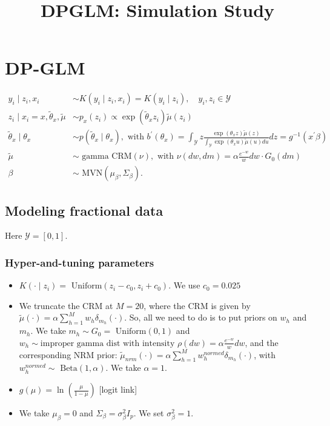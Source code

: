 \documentclass[10pt, oneside]{article}   	%
\title{\bf DPGLM: Simulation Study}
\date{}							%
\renewcommand{\th}{\theta}
\newcommand{\sy}{\mathcal{Y}}
\renewcommand{\sy}{\mathcal{Y}}
\newcommand{\tmu}{\widetilde{\mu}}
\begin{document}
\maketitle

\section{DP-GLM}
\begin{align}
 y_i \mid  z_i, x_i & \sim K(y_i \mid z_i, x_i) = K(y_i \mid z_i), \quad y_i, z_i \in \sy \\
z_i \mid x_i = x, \widetilde \theta_{x}, \tmu & \sim p_x(z_i) \propto
                                       \exp(\widetilde \th_{x} z_i) \widetilde
                                       \mu(z_i) \\ 
\widetilde \theta_x \mid \theta_x & \sim p(\widetilde \theta_x \mid \theta_x), \text{ with } b^\prime(\theta_x) = \int_\sy z \frac{\exp( \th_{x} z) \widetilde
                                       \mu(z)}{\int_\sy \exp(\th_{x} u ) \widetilde
                                       \mu(u) du} dz = g^{-1}(x^\prime \beta)  \\ 
\tmu & \sim \text{ gamma CRM}(\nu), \text{ with } \nu(dw, dm) =  \alpha \frac{e^{-w}}{w} dw \cdot G_0(dm) \\ 
\beta & \sim \text{ MVN}(\mu_\beta, \Sigma_\beta). 
\label{dpglm}
\end{align}

\subsection{Modeling fractional data}
Here $\sy = [0, 1]$.
\subsubsection{Hyper-and-tuning parameters}
\begin{itemize}
    \item $K(\cdot \mid z_i)  = \text{ Uniform}(z_i - c_0, z_i + c_0)$. We use $c_0 = 0.025$
    \item We truncate the CRM at $M = 20$, where the CRM is given by $\tmu(\cdot) = \alpha \sum_{h = 1}^M w_h \delta_{m_h}(\cdot)$. So, all we need to do is to put priors on $w_h$ and $m_h$. We take $m_h \sim G_0 = \text{ Uniform}(0, 1)$ and $w_h \sim \text{improper gamma dist with intensity } \rho(dw) = \alpha \frac{e^{-w}}{w}dw$, and the corresponding NRM prior: $\tmu_{nrm}(\cdot) = \alpha \sum_{h = 1}^M w^{normed}_{h} \delta_{m_h}(\cdot)$, with $w^{normed}_{h} \sim \text{ Beta}(1, \alpha)$. We take $\alpha = 1$.
    \item $g(\mu) = \ln(\frac{\mu}{1 - \mu})$ [logit link]
    \item We take $\mu_\beta = 0$ and $\Sigma_\beta = \sigma^2_\beta I_p$. We set $\sigma^2_\beta = 1$.
\end{itemize}
\end{document}
